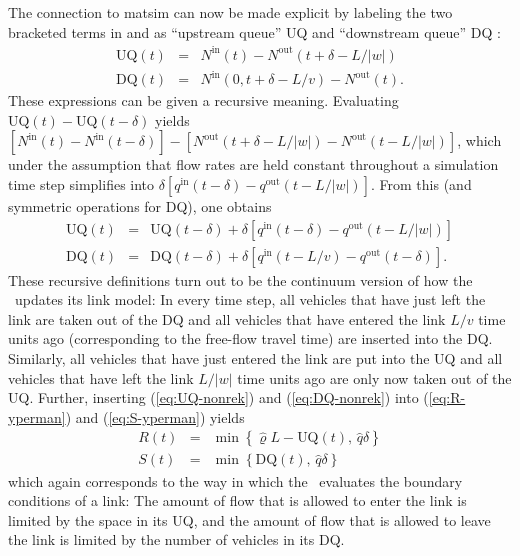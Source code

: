 The connection to \gls{matsim} can now be made explicit by labeling the
two bracketed terms in  and 
as {}``upstream queue'' UQ and {}``downstream queue'' DQ \citep{osorio-2011a,osorio-2013b}:
\begin{eqnarray}
\text{UQ}(t) & = & N^{\text{in}}(t)-N^{\text{out}}(t+\delta-L/|w|)\label{eq:UQ-nonrek}\\
\text{DQ}(t) & = & N^{\text{in}}(0,t+\delta-L/v)-N^{\text{out}}(t)\label{eq:DQ-nonrek}.
\end{eqnarray}
These expressions can be given a recursive meaning. Evaluating
$\text{UQ}(t) - \text{UQ}(t - \delta)$ yields 
$[N^{\text{in}}(t) - N^{\text{in}}(t-\delta)] - [N^{\text{out}}(t+\delta-L/|w|) - N^{\text{out}}(t-L/|w|) ]$,
which under the assumption that flow rates are held constant throughout a simulation time step
simplifies into $\delta [ q^{\text{in}}(t-\delta) - q^{\text{out}}(t-L/|w|) ]$.
From this (and symmetric operations for DQ), one obtains
\begin{eqnarray}
\text{UQ}(t) & = & \text{UQ}(t-\delta)+\delta\left[q^{\text{in}}(t-\delta)-q^{\text{out}}(t-L/|w|)\right]\label{eq:UQ-rek}\\
\text{DQ}(t) & = & \text{DQ}(t-\delta)+\delta\left[q^{\text{in}}(t-L/v)-q^{\text{out}}(t-\delta)\right].\label{eq:DQ-rek}
\end{eqnarray}
These recursive definitions turn out to be the continuum version of
how the \DOUBLEQUEUESIM\ updates its link model: In
every time step, all vehicles that have just left the link are taken
out of the DQ and all vehicles that have entered the link $L/v$ time
units ago (corresponding to the free-flow travel time) are inserted
into the DQ. Similarly, all vehicles that have just entered the link
are put into the UQ and all vehicles that have left the link $L/|w|$
time units ago are only now taken out of the UQ. Further, inserting
(\ref{eq:UQ-nonrek}) and (\ref{eq:DQ-nonrek}) into (\ref{eq:R-yperman})
and (\ref{eq:S-yperman}) yields
\begin{eqnarray}
R(t) & = & \min\left\{ \hat{\varrho}L-\text{UQ}(t),\,\hat{q}\delta\right\} \label{eq:R-matsim}\\
S(t) & = & \min\left\{ \text{DQ}(t),\,\hat{q}\delta\right\} \label{eq:S-matsim}
\end{eqnarray}
which again corresponds to the way in which the \DOUBLEQUEUESIM\ 
evaluates the boundary conditions of a link: The amount of flow that
is allowed to enter the link is limited by the space in its UQ, and
the amount of flow that is allowed to leave the link is limited by the
number of vehicles in its DQ. 

